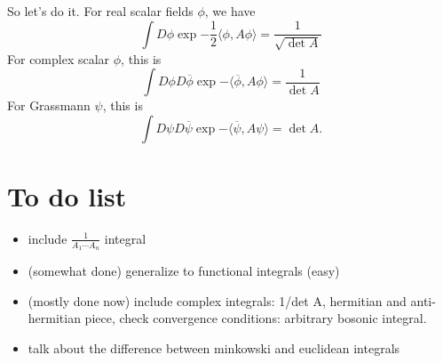 \documentclass{book}
\begin{document}
So let's do it. For real scalar fields $\phi$, we have
\[
\int D \phi \exp{-\frac{1}{2} \langle \phi, A \phi \rangle} = \frac{1}{\sqrt{\det A}}
\]
For complex scalar $\phi$, this is
\[
\int D \phi D\overline{\phi} \exp{-\langle \overline{\phi},A\phi \rangle} = \frac{1}{\det A}
\]
For Grassmann $\psi$, this is
\[
\int D \psi D \overline{\psi} \exp{-\langle \overline{\psi}, A\psi \rangle} = \det A.
\]
\section{To do list} 
\begin{itemize}
\item include $\frac{1}{A_1 \cdots A_n}$ integral
\item (somewhat done) generalize to functional integrals (easy)
\item (mostly done now) include complex integrals: 1/det A, hermitian and anti-hermitian piece, check convergence conditions: arbitrary bosonic integral.
\item talk about the difference between minkowski and euclidean integrals
\end{itemize}
\end{document}
